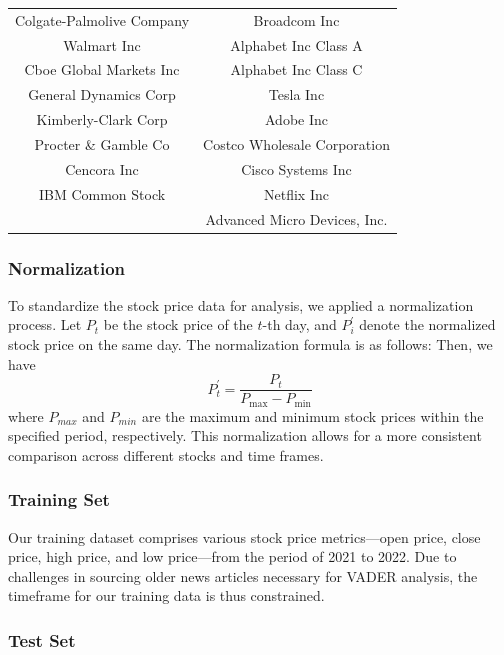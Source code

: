 \begin{table}[h]
\begin{tabular}{cc}
	Colgate-Palmolive Company		&	Broadcom Inc										\\
	Walmart Inc						&	Alphabet Inc Class A								\\
	Cboe Global Markets Inc			&	Alphabet Inc Class C								\\
	General Dynamics Corp			&	Tesla Inc											\\
	Kimberly-Clark Corp				&	Adobe Inc											\\
	Procter \& Gamble Co			&	Costco Wholesale Corporation						\\
	Cencora Inc						&	Cisco Systems Inc									\\
	IBM Common Stock				&	Netflix Inc											\\
									&	Advanced Micro Devices, Inc.						\\
	\bottomrule
	\end{tabular}
\end{table}

\subsubsection{Normalization}

To standardize the stock price data for analysis, we applied a normalization process. Let $P_{t}$ be the stock price of the $t$-th day, and $P_{i}^{\prime}$ denote the normalized stock price on the same day. The normalization formula is as follows:
Then, we have
\begin{equation}
	P_{t}^{\prime} = \frac{P_{t}}{P_{\max} - P_{\min}}
\end{equation}
where $P_{max}$ and $P_{min}$ are the maximum and minimum stock prices within the specified period, respectively. This normalization allows for a more consistent comparison across different stocks and time frames.

\subsubsection{Training Set}

Our training dataset comprises various stock price metrics—open price, close price, high price, and low price—from the period of 2021 to 2022. 
Due to challenges in sourcing older news articles necessary for VADER analysis, the timeframe for our training data is thus constrained.

\subsubsection{Test Set}

